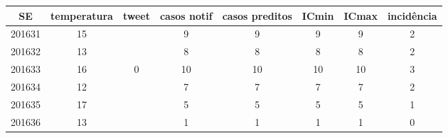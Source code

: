 \begin{tabular}{c|ccccccc}
  \hline
SE & temperatura & tweet & casos notif & casos preditos & ICmin & ICmax & incidência \\ 
  \hline
201631 & 15 &  & 9 & 9 & 9 & 9 & 2 \\ 
  201632 & 13 &  & 8 & 8 & 8 & 8 & 2 \\ 
  201633 & 16 & 0 & 10 & 10 & 10 & 10 & 3 \\ 
  201634 & 12 &  & 7 & 7 & 7 & 7 & 2 \\ 
  201635 & 17 &  & 5 & 5 & 5 & 5 & 1 \\ 
  201636 & 13 &  & 1 & 1 & 1 & 1 & 0 \\ 
   \hline
\end{tabular}
